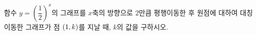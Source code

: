 함수 $y=\left(\dfrac{1}{2}\right)^{x}$의 그래프를 $x$축의 방향으로 $2$만큼 평행이동한 후 원점에 대하여 대칭이동한 그래프가 점 $(1{,}\mkern3mu\mathopen{}k)$를 지날 때, $k$의 값을 구하시오.

